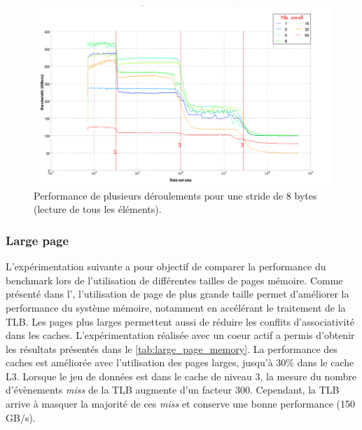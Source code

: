         \begin{figure}
        \center
        \includegraphics[width=16cm]{images/dml_unroll_best.png}
        \caption{\label{pic:dml_unroll_best} Performance de plusieurs déroulements pour une stride de 8 bytes (lecture de tous les éléments).}
        \end{figure}
        
    
    \subsubsection{Large page} \label{sec:dml_large_page}

    L'expérimentation suivante a pour objectif de comparer la performance du benchmark lors de l'utilisation de différentes tailles de pages mémoire. Comme présenté dans l', l'utilisation de page de plus grande taille permet d'améliorer la performance du système mémoire, notamment en accélérant le traitement de la TLB. Les pages plus larges permettent aussi de réduire les conflits d'associativité dans les caches. L'expérimentation réalisée avec un coeur actif a permis d'obtenir les résultats présentés dans le \autoref{tab:large_page_memory}. La performance des caches est améliorée avec l'utilisation des pages larges, jusqu'à 30\% dans le cache L3. Lorsque le jeu de données est dans le cache de niveau 3, la mesure du nombre d'évènements \textit{miss} de la TLB augmente d'un facteur 300. Cependant, la TLB arrive à masquer la majorité de ces \textit{miss} et conserve une bonne performance (150 GB/s).

